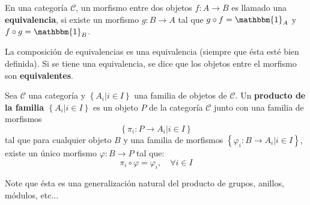 \documentclass[12pt]{report}
\theoremstyle{largebreak}
\newcommand\cf[3]{\ensuremath{#1:#2\rightarrow#3}}
\newcommand{\bbm}[1]{\mathbbm{#1}}
\begin{document}
    \begin{mydef}
        En una categoría $\mathcal{C}$, un morfismo entre dos objetos $\cf{f}{A}{B}$ es llamado una \textbf{equivalencia}, si existe un morfismo $\cf{g}{B}{A}$ tal que $g\circ f=\bbm{1}_A$ y $f\circ g=\bbm{1}_B$.
    \end{mydef}

    \begin{obs}
        La composición de equivalencias es una equivalencia (siempre que ésta esté bien definida). Si se tiene una equivalencia, se dice que los objetos entre el morfismo son \textbf{equivalentes}.
    \end{obs}

    \begin{mydef}
        Sea $\mathcal{C}$ una categoría y $\left\{A_i\Big|i\in I \right\}$ una familia de objetos de $\mathcal{C}$. Un \textbf{producto de la familia $\left\{A_i\Big|i\in I \right\}$} es un objeto $P$ de la categoría $\mathcal{C}$ junto con una familia de morfismos
        \begin{equation*}
            \left\{\cf{\pi_i}{P}{A_i}\Big|i\in I \right\}
        \end{equation*}
        tal que para cualquier objeto $B$ y una familia de morfismos $\left\{\cf{\varphi_i}{B}{A_i}\Big|i\in I \right\}$, existe un único morfismo $\cf{\varphi}{B}{P}$ tal que:
        \begin{equation*}
            \pi_i\circ\varphi=\varphi_i,\quad\forall i\in I
        \end{equation*}
    \end{mydef}

    Note que ésta es una generalización natural del producto de grupos, anillos, módulos, etc...
\end{document}
